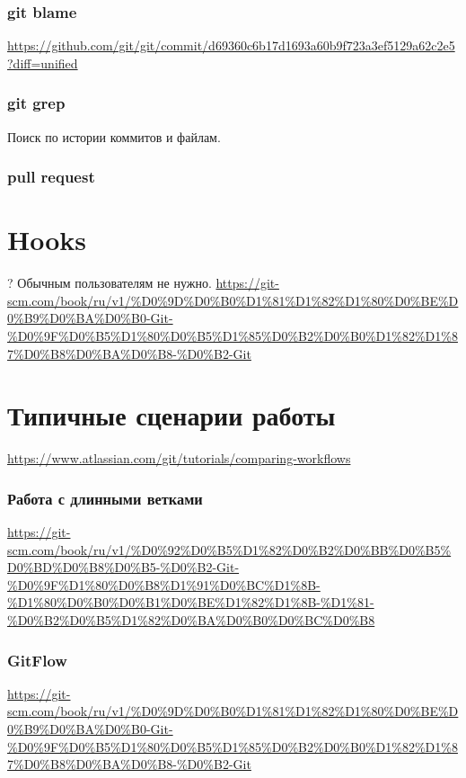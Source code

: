 \documentclass[bigger]{beamer}
\begin{document}
\begin{frame}
\frametitle{git blame}
\label{sec-3-12}

\href{https://github.com/git/git/commit/d69360c6b17d1693a60b9f723a3ef5129a62c2e5?diff=unified}{https://github.com/git/git/commit/d69360c6b17d1693a60b9f723a3ef5129a62c2e5?diff=unified}
\end{frame}
\begin{frame}
\frametitle{git grep}
\label{sec-3-13}

Поиск по истории коммитов и файлам.
\end{frame}
\begin{frame}
\frametitle{pull request}
\label{sec-3-14}
\end{frame}
\section{Hooks}
\label{sec-4}

? Обычным пользователям не нужно.
\href{https://git-scm.com/book/ru/v1/%D0%9D%D0%B0%D1%81%D1%82%D1%80%D0%BE%D0%B9%D0%BA%D0%B0-Git-%D0%9F%D0%B5%D1%80%D0%B5%D1%85%D0%B2%D0%B0%D1%82%D1%87%D0%B8%D0%BA%D0%B8-%D0%B2-Git}{https://git-scm.com/book/ru/v1/\%D0\%9D\%D0\%B0\%D1\%81\%D1\%82\%D1\%80\%D0\%BE\%D0\%B9\%D0\%BA\%D0\%B0-Git-\%D0\%9F\%D0\%B5\%D1\%80\%D0\%B5\%D1\%85\%D0\%B2\%D0\%B0\%D1\%82\%D1\%87\%D0\%B8\%D0\%BA\%D0\%B8-\%D0\%B2-Git}
\section{Типичные сценарии работы}
\label{sec-5}

\href{https://www.atlassian.com/git/tutorials/comparing-workflows}{https://www.atlassian.com/git/tutorials/comparing-workflows}
\begin{frame}
\frametitle{Работа с длинными ветками}
\label{sec-5-1}

\href{https://git-scm.com/book/ru/v1/%D0%92%D0%B5%D1%82%D0%B2%D0%BB%D0%B5%D0%BD%D0%B8%D0%B5-%D0%B2-Git-%D0%9F%D1%80%D0%B8%D1%91%D0%BC%D1%8B-%D1%80%D0%B0%D0%B1%D0%BE%D1%82%D1%8B-%D1%81-%D0%B2%D0%B5%D1%82%D0%BA%D0%B0%D0%BC%D0%B8}{https://git-scm.com/book/ru/v1/\%D0\%92\%D0\%B5\%D1\%82\%D0\%B2\%D0\%BB\%D0\%B5\%D0\%BD\%D0\%B8\%D0\%B5-\%D0\%B2-Git-\%D0\%9F\%D1\%80\%D0\%B8\%D1\%91\%D0\%BC\%D1\%8B-\%D1\%80\%D0\%B0\%D0\%B1\%D0\%BE\%D1\%82\%D1\%8B-\%D1\%81-\%D0\%B2\%D0\%B5\%D1\%82\%D0\%BA\%D0\%B0\%D0\%BC\%D0\%B8}
\end{frame}
\begin{frame}
\frametitle{GitFlow}
\label{sec-5-2}

\href{https://git-scm.com/book/ru/v1/%D0%9D%D0%B0%D1%81%D1%82%D1%80%D0%BE%D0%B9%D0%BA%D0%B0-Git-%D0%9F%D0%B5%D1%80%D0%B5%D1%85%D0%B2%D0%B0%D1%82%D1%87%D0%B8%D0%BA%D0%B8-%D0%B2-Git}{https://git-scm.com/book/ru/v1/\%D0\%9D\%D0\%B0\%D1\%81\%D1\%82\%D1\%80\%D0\%BE\%D0\%B9\%D0\%BA\%D0\%B0-Git-\%D0\%9F\%D0\%B5\%D1\%80\%D0\%B5\%D1\%85\%D0\%B2\%D0\%B0\%D1\%82\%D1\%87\%D0\%B8\%D0\%BA\%D0\%B8-\%D0\%B2-Git}
\end{frame}
\end{document}
